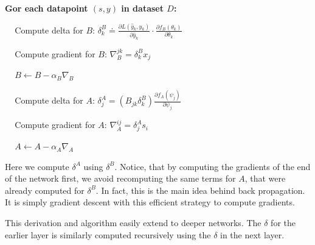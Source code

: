 \documentclass[12pt, a4paper]{article}
\begin{document}
\begin{tcolorbox}[title={Backpropagation Algorithm (w. SGD)}]

\textbf{Gor each datapoint $(s,y)$ in dataset $D$:}
\begin{description}
    \item $\;\;\;$ Compute delta for $B$: $\delta_k^B \doteq \frac{\partial L(\hat{y}_k, y_k)}{\partial \hat{y}_k} \cdot \frac{\partial f_B(\theta_k)}{\partial \theta_k}$
    \item $\;\;\;$ Compute gradient for $B$: $\nabla_B^{jk} = \delta_k^B x_j$
    \item $\;\;\;$ $B \leftarrow B - \alpha_B \nabla_B$
\end{description}
\tcblower
\begin{description}
    \item $\;\;\;$ Compute delta for $A$: $\delta_j^A = (B_{jk} \delta_k^B) \frac{\partial f_A(\psi_j)}{\partial \psi_j}$
    \item $\;\;\;$ Compute gradient for $A$: $\nabla_A^{ij} = \delta_j^A s_i$
    \item $\;\;\;$ $A \leftarrow A - \alpha_A \nabla_A$
\end{description}
\end{tcolorbox}

Here we compute $\delta^A$ using $\delta^B$. Notice, that by computing the gradients of the end of the network first, we avoid recomputing the same terms for $A$, that were already computed for $\delta^B$. In fact, this is the main idea behind back propagation. It is simply gradient descent with this efficient strategy to compute gradients.

This derivation and algorithm easily extend to deeper networks. The $\delta$ for the earlier layer is similarly computed recursively using the $\delta$ in the next layer.

\bigskip
\end{document}
